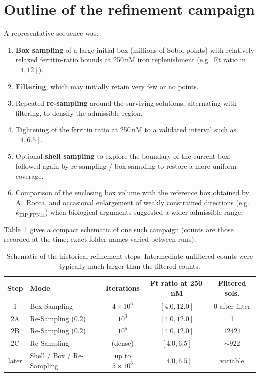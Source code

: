 \section{Outline of the refinement campaign}
A representative sequence was:
\begin{enumerate}
  \item \textbf{Box sampling} of a large initial box (millions of Sobol points)
  with relatively relaxed ferritin-ratio bounds at 250\,nM iron replenishment
  (e.g.\ Ft ratio in $[4,12]$).
  \item \textbf{Filtering}, which may initially retain very few or no points.
  \item Repeated \textbf{re-sampling} around the surviving solutions, alternating
  with filtering, to densify the admissible region.
  \item Tightening of the ferritin ratio at 250\,nM to a validated interval
  such as $[4, 6.5]$.
  \item Optional \textbf{shell sampling} to explore the boundary of the current
  box, followed again by re-sampling / box sampling to restore a more uniform
  coverage.
  \item Comparison of the enclosing box volume with the reference box obtained
  by A.~Rocca, and occasional enlargement of weakly constrained directions
  (e.g.\ $k_{\mathrm{IRP\_FPN1a}}$) when biological arguments suggested a wider
  admissible range.
\end{enumerate}

Table~\ref{tab:protocol-summary} gives a compact schematic of one such campaign
(counts are those recorded at the time; exact folder names varied between runs).

\begin{table}[!ht]
\centering
\begin{tabular}{clccc}
\toprule
Step & Mode & Iterations & Ft ratio at 250\,nM & Filtered sols. \\
\midrule
1 & Box-Sampling & $4\times10^6$ & $[4.0,12.0]$ & 0 after filter \\
2A & Re-Sampling ($0.2$) & $10^3$ & $[4.0,12.0]$ & 1 \\
2B & Re-Sampling ($0.2$) & $10^5$ & $[4.0,12.0]$ & $12421$ \\
2C & Re-Sampling & (dense) & $[4.0,6.5]$ & $\sim 922$ \\
later & Shell / Box / Re-Sampling & up to $5\times10^6$ & $[4.0,6.5]$ & variable \\
\bottomrule
\end{tabular}
\caption{Schematic of the historical refinement steps. Intermediate unfiltered
counts were typically much larger than the filtered counts.}
\label{tab:protocol-summary}
\end{table}

